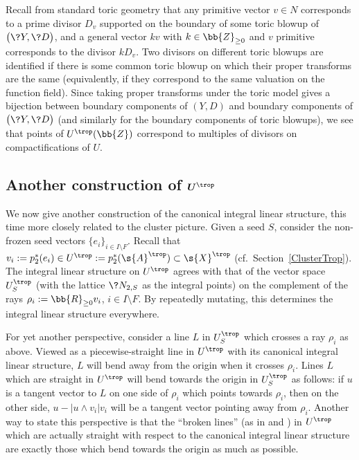 \begin{rmk}\label{divisorial} Recall from standard toric geometry that any primitive vector $v\in N$ corresponds to a prime divisor $D_v$ supported on the boundary of some toric blowup of $\big(\?{Y},\?{D}\big)$, and a general vector $kv$ with $k\in \bb{Z}_{\geq 0}$ and $v$ primitive corresponds to the divisor $kD_{v}$. Two divisors on different toric blowups are identified if there is some common toric blowup on which their proper transforms are the same (equivalently, if they correspond to the same valuation on the function field). Since taking proper transforms under the toric model gives a bijection between boundary components of $(Y,D)$ and boundary components of $\big(\?{Y},\?{D}\big)$ (and similarly for the boundary components of toric blowups), we see that points of $U^{\trop}(\bb{Z})$ correspond to multiples of divisors on compactifications of $U$.
\end{rmk}

\subsection[Another construction of $U^{\trop}$]{Another construction of $\boldsymbol{U^{\trop}}$}\label{SeedScatter}
We now give another construction of the canonical integral linear structure, this time more closely related to the cluster picture. Given a seed $S$, consider the non-frozen seed vectors $\{e_i\}_{i\in I\setminus F}$. Recall that $v_i:=p_2^*(e_i) \in U^{\trop}:=p_2^*(\s{A}^{\trop})\subset \s{X}^{\trop}$ (cf.\ Section~\ref{ClusterTrop}). The integral linear structure on $U^{\trop}$ agrees with that of the vector space $U^{\trop}_S$ (with the lattice $\?{N_{2,S}}$ as the integral points) on the complement of the rays $\rho_i:=\bb{R}_{\geq 0} v_i$, $i\in I\setminus F$. By repeatedly mutating, this determines the integral linear structure everywhere.

For yet another perspective, consider a line $L$ in $U^{\trop}_S$ which crosses a ray $\rho_i$ as above. Viewed as a piecewise-straight line in $U^{\trop}$ with its canonical integral linear structure, $L$ will bend away from the origin when it crosses $\rho_i$. Lines $L$ which are straight in $U^{\trop}$ will bend towards the origin in $U^{\trop}_S$ as follows: if $u$ is a tangent vector to $L$ on one side of $\rho_i$ which points towards $\rho_i$, then on the other side, $u-|u\wedge v_i| v_i$ will be a tangent vector pointing away from $\rho_i$.
 Another way to state this perspective is that the ``broken lines'' (as in \cite{GHK1} and \cite{GHKK}) in $U^{\trop}$ which are actually straight with respect to the canonical integral linear structure are exactly those which bend towards the origin as much as possible.

